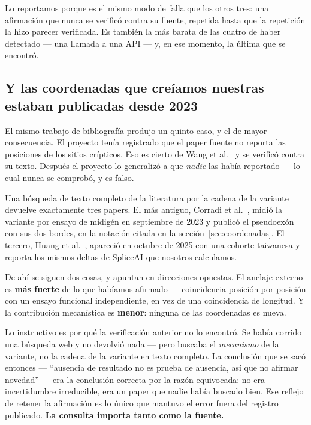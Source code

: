 \documentclass[11pt,a4paper]{article}
\begin{document}
Lo reportamos porque es el mismo modo de falla que los otros tres: una afirmación que nunca se
verificó contra su fuente, repetida hasta que la repetición la hizo parecer verificada. Es también la
más barata de las cuatro de haber detectado --- una llamada a una API --- y, en ese momento, la
última que se encontró.

\subsection{Y las coordenadas que creíamos nuestras estaban publicadas desde 2023}
\label{sec:novedad}

El mismo trabajo de bibliografía produjo un quinto caso, y el de mayor consecuencia. El proyecto
tenía registrado que el paper fuente no reporta las posiciones de los sitios crípticos. Eso es
cierto de Wang et al.~\cite{wang2025} y se verificó contra su texto. Después el proyecto lo
generalizó a que \emph{nadie} las había reportado --- lo cual nunca se comprobó, y es falso.

Una búsqueda de texto completo de la literatura por la cadena de la variante devuelve exactamente
tres papers. El más antiguo, Corradi et al.~\cite{corradi2023}, midió la variante por ensayo de
midigén en septiembre de 2023 y publicó el pseudoexón con sus dos bordes, en la notación citada en
la sección~\ref{sec:coordenadas}. El tercero, Huang et al.~\cite{huang2025}, apareció en octubre de
2025 con una cohorte taiwanesa y reporta los mismos deltas de SpliceAI que nosotros calculamos.

De ahí se siguen dos cosas, y apuntan en direcciones opuestas. El anclaje externo es
\textbf{más fuerte} de lo que habíamos afirmado --- coincidencia posición por posición con un ensayo
funcional independiente, en vez de una coincidencia de longitud. Y la contribución mecanística es
\textbf{menor}: ninguna de las coordenadas es nueva.

Lo instructivo es por qué la verificación anterior no lo encontró. Se había corrido una búsqueda web
y no devolvió nada --- pero buscaba el \emph{mecanismo} de la variante, no la cadena de la variante
en texto completo. La conclusión que se sacó entonces --- ``ausencia de resultado no es prueba de
ausencia, así que no afirmar novedad'' --- era la conclusión correcta por la razón equivocada: no
era incertidumbre irreducible, era un paper que nadie había buscado bien. Ese reflejo de retener la
afirmación es lo único que mantuvo el error fuera del registro publicado. \textbf{La consulta
importa tanto como la fuente.}
\end{document}
